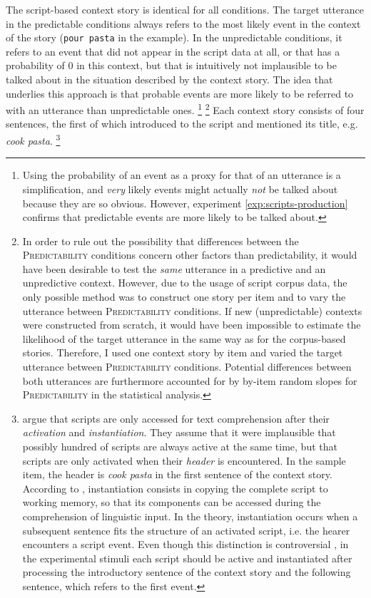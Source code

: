 The script-based context story is identical for all conditions. The target utterance in the predictable conditions always refers to the most likely event in the context of the story (\texttt{pour pasta} in the example). In the unpredictable conditions, it refers to an event that did not appear in the script data at all, or that has a probability of 0 in this context, but that is intuitively not implausible to be talked about in the situation described by the context story. The idea that underlies this approach is that probable events are more likely to be referred to with an utterance than unpredictable ones.%
%
\footnote{Using the probability of an event as a proxy for that of an utterance is a simplification, and \textit{very} likely events might actually \textit{not} be talked about because they are so obvious. However, experiment \ref{exp:scripts-production} confirms that predictable events are more likely to be talked about.}\afterfn%
%
\footnote{In order to rule out the possibility that differences between the \textsc{Predictability} conditions concern other factors than predictability, it would have been desirable to test the \textit{same} utterance in a predictive and an unpredictive context. However, due to the usage of script corpus data, the only possible method was to construct one story per item and to vary the utterance between \textsc{Predictability} conditions. If new (unpredictable) contexts were constructed from scratch, it would have been impossible to estimate the likelihood of the target utterance in the same way as for the corpus-based stories. Therefore, I used one context story by item and varied the target utterance between \textsc{Predictability} conditions. Potential differences between both utterances are furthermore accounted for by by-item random slopes for \textsc{Predictability} in the statistical analysis.}\afterfn%
%
Each context story consists of four sentences, the first of which introduced to the script and mentioned its title, e.g. \textit{cook pasta}.%
% 
\footnote{\citet{schank.abelson1977} argue that scripts are only accessed for text comprehension after their \textit{activation} and \textit{instantiation}. They assume that it were implausible that possibly hundred of scripts are always active at the same time, but that scripts are only activated when their \textit{header} is encountered. In the sample item, the header is \textit{cook pasta} in the first sentence of the context story. According to \citet[47--48]{schank.abelson1977}, instantiation consists in copying the complete script to working memory, so that its components can be accessed during the comprehension of linguistic input. In the theory, instantiation occurs when a subsequent sentence fits the structure of an activated script, i.e. the hearer encounters a script event. Even though this distinction is controversial \citep[see e.g.][]{rabs.etal2017}, in the experimental stimuli each script should be active and instantiated after processing the introductory sentence of the context story and the following sentence, which refers to the first event.}\afterfn%
